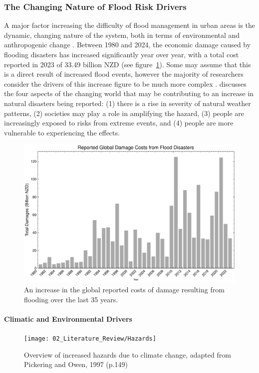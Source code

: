 \subsubsection{The Changing Nature of Flood Risk Drivers}
A major factor increasing the difficulty of flood management in urban areas is
the dynamic, changing nature of the system, both in terms of environmental and
anthropogenic change \parencite{ODonnell2020, randhir2011}. Between 1980 and
2024, the economic damage caused by flooding disasters has increased
significantly year over year, with a total cost reported in 2023 of 33.49
billion NZD (see figure~\ref{fig:damagecosts}). Some may assume that this is a
direct result of increased flood events, however the majority of researchers
consider the drivers of this increase figure to be much more complex
\parencite{Ward1978, White2013}. \textcite{White2013} discusses the four aspects
of the changing world that may be contributing to an increase in natural
disasters being reported: (1) there is a rise in severity of natural weather
patterns, (2) societies may play a role in amplifying the hazard, (3) people are
increasingly exposed to risks from extreme events, and (4) people are more
vulnerable to experiencing the effects. 

\begin{figure}
    \centering
    \includegraphics[width=1.0\linewidth]{Content/Figures/02_Literature_Review/damage_costs_natural_disasters}
    \caption{An increase in the global reported costs of damage resulting from flooding over the last 35 years.}
    \label{fig:damagecosts}
\end{figure}

\paragraph{Climatic and Environmental Drivers}
\begin{figure} %
  \centering
  \texttt{[image: 02\_Literature\_Review/Hazards]}
  \vspace{-1em}
  \caption{Overview of increased hazards due to climate change, adapted from Pickering and Owen, 1997 (p.149)}
  \label{fig:hazards}
\end{figure}


